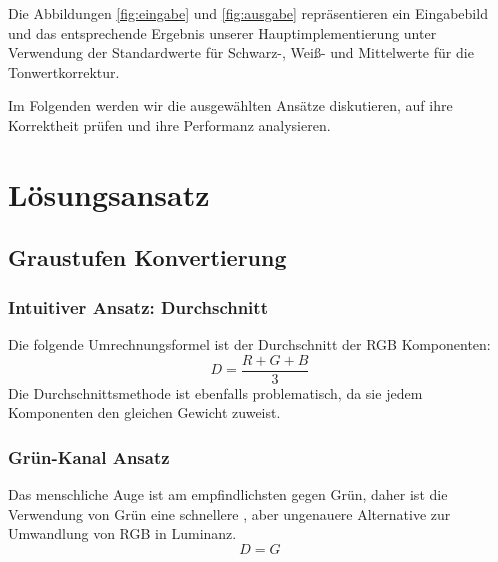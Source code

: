 \documentclass[course=erap]{aspdoc}
\begin{document}
Die Abbildungen \ref{fig:eingabe} und \ref{fig:ausgabe} repräsentieren ein Eingabebild und das entsprechende Ergebnis unserer Hauptimplementierung unter Verwendung der Standardwerte für Schwarz-, Weiß- und Mittelwerte für die Tonwertkorrektur.


Im Folgenden werden wir die ausgewählten Ansätze diskutieren, auf ihre Korrektheit prüfen und ihre Performanz analysieren.


\section{Lösungsansatz}


\subsection{Graustufen Konvertierung}
\subsubsection{Intuitiver Ansatz: Durchschnitt}

Die folgende Umrechnungsformel ist der Durchschnitt der RGB Komponenten:
 \[ D = \frac{R + G + B}{3}  \]
Die Durchschnittsmethode ist ebenfalls problematisch, da sie jedem Komponenten den gleichen Gewicht zuweist.

\subsubsection{Grün-Kanal Ansatz}
Das menschliche Auge ist am empfindlichsten gegen Grün, daher ist die Verwendung von Grün eine schnellere , aber ungenauere  Alternative zur Umwandlung von RGB in Luminanz.
\[D = G\] 
\end{document}

